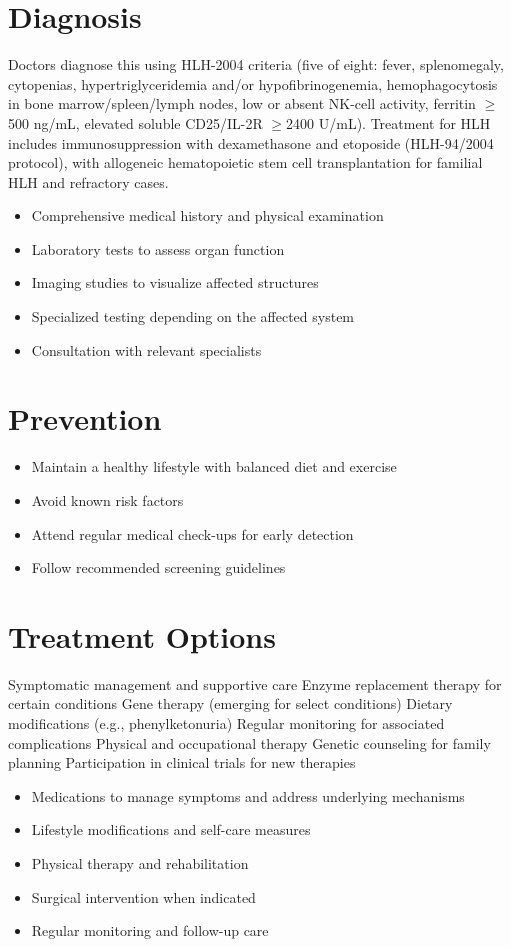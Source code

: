 \section{Diagnosis}
Doctors diagnose this using HLH-2004 criteria (five of eight: fever, splenomegaly, cytopenias, hypertriglyceridemia and/or hypofibrinogenemia, hemophagocytosis in bone marrow/spleen/lymph nodes, low or absent NK-cell activity, ferritin $\geq$500 ng/mL, elevated soluble CD25/IL-2R $\geq$2400 U/mL). Treatment for HLH includes immunosuppression with dexamethasone and etoposide (HLH-94/2004 protocol), with allogeneic hematopoietic stem cell transplantation for familial HLH and refractory cases.

\begin{itemize}[noitemsep]
  \item Comprehensive medical history and physical examination
  \item Laboratory tests to assess organ function
  \item Imaging studies to visualize affected structures
  \item Specialized testing depending on the affected system
  \item Consultation with relevant specialists
\end{itemize}
\section{Prevention}
\begin{itemize}[noitemsep]
  \item Maintain a healthy lifestyle with balanced diet and exercise
  \item Avoid known risk factors
  \item Attend regular medical check-ups for early detection
  \item Follow recommended screening guidelines
\end{itemize}
\section{Treatment Options}
Symptomatic management and supportive care Enzyme replacement therapy for certain conditions Gene therapy (emerging for select conditions) Dietary modifications (e.g., phenylketonuria) Regular monitoring for associated complications Physical and occupational therapy Genetic counseling for family planning Participation in clinical trials for new therapies

\begin{itemize}[noitemsep]
  \item Medications to manage symptoms and address underlying mechanisms
  \item Lifestyle modifications and self-care measures
  \item Physical therapy and rehabilitation
  \item Surgical intervention when indicated
  \item Regular monitoring and follow-up care
\end{itemize}
